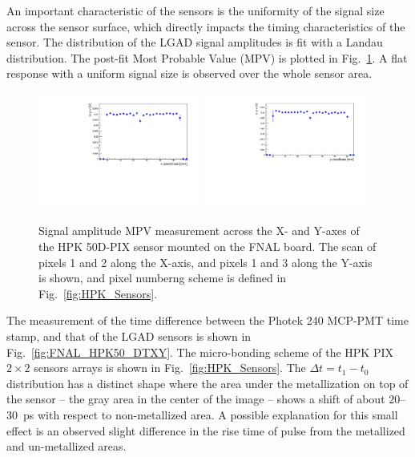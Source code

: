 \documentclass[preprint,1p]{elsarticle}
\begin{document}
An important characteristic of the sensors is the uniformity of the signal size
across the sensor surface, which directly impacts the timing characteristics of
the sensor. The distribution of the LGAD signal amplitudes is fit with a Landau
distribution. The post-fit Most Probable Value (MPV) is
plotted in Fig.~\ref{fig:FNAL_HPK50_MPVXY}. A flat response with a uniform
signal size is observed over the whole sensor area.

\begin{figure}[htbp] 
\centering
\includegraphics[width=0.48\textwidth]{figs/FNALBoard_HPK50DPix_Run847-891/MPV_vs_X_Ch4_5.pdf} 
\includegraphics[width=0.48\textwidth]{figs/FNALBoard_HPK50DPix_Run847-891/MPV_vs_Y_Ch3_4.pdf} 
\caption{Signal amplitude MPV measurement across the X- and Y-axes of the HPK 50D-PIX sensor mounted on the FNAL board. The scan of pixels 1 and 2 along the X-axis, and pixels 1 and 3 along the Y-axis is shown, and pixel numberng scheme is defined in Fig.~\ref{fig:HPK_Sensors}.} 
\label{fig:FNAL_HPK50_MPVXY} 
\end{figure} 


The measurement of the time difference between the Photek 240 MCP-PMT time
stamp, and that of the LGAD sensors is shown in Fig.~\ref{fig:FNAL_HPK50_DTXY}.
The micro-bonding scheme of the HPK PIX $2\times 2$ sensors arrays is shown in
Fig.~\ref{fig:HPK_Sensors}. The $\Delta t = t_{1}-t_{0}$ distribution has a
distinct shape where the area under the metallization on top of the sensor -- the
gray area in the center of the image -- shows a shift of about $20$--$30$~ps with
respect to non-metallized area. A possible explanation for this small effect is
an observed slight difference in the rise time of pulse from the metallized and
un-metallized areas. 
\end{document}
